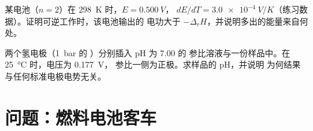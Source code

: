 \begin{exercise}[$\star\star\star$]\label{exo:b2:cell-thermodynamics:11}
某电池（$n = 2$）在 \qty{298}{K} 时，$E = \qty{0.500}{V}$，
$dE/dT = \qty{+3.0e-4}{V/K}$（练习数据）。证明可逆工作时，该电池输出的
电功大于 $-\Delta_r H$，并说明多出的能量来自何处。
\end{exercise}

\begin{exercise}[$\star\star\star$]\label{exo:b2:cell-thermodynamics:12}
两个氢电极（\qty{1}{bar} 的 ）分别插入 pH 为 7.00 的
参比溶液与一份样品中。在 \qty{25}{\degreeCelsius} 时，电压为 \qty{0.177}{V}，
参比一侧为正极。求样品的 pH，并说明
为何结果与任何标准电极电势无关。
\end{exercise}

\section{问题：燃料电池客车}

